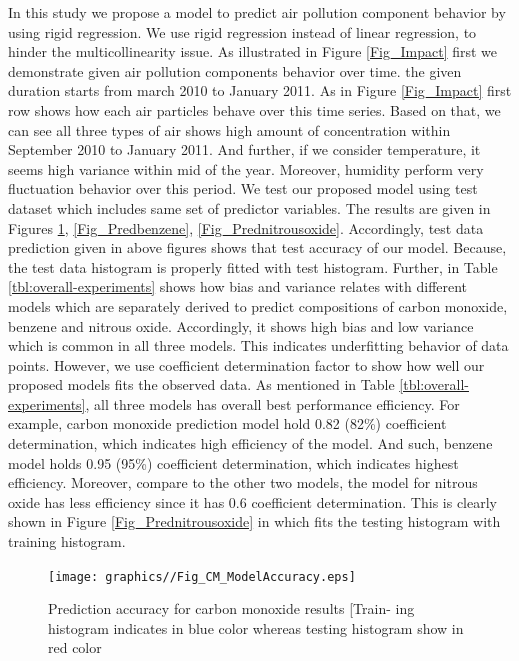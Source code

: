 In this study we propose a model to 
predict air pollution component behavior by using rigid regression. 
We use rigid regression instead of linear regression,
to hinder the multicollinearity issue. 
As illustrated in Figure \ref{Fig_Impact} first we 
demonstrate given air pollution components behavior over time.
the given duration starts from march 2010 to January 2011.
As in Figure \ref{Fig_Impact} first row shows how each 
air particles behave over this time series. 
Based on that, we can see all three types of air shows 
high amount of concentration within September 2010 to January 2011.
And further, if we consider temperature, it seems high variance within mid of the year.
Moreover, humidity perform very fluctuation behavior over this period.
We test our proposed model using test dataset which 
includes same set of predictor variables.
The results are given in Figures \ref{Fig_Predcarbon monoxide}, \ref{Fig_Predbenzene}, \ref{Fig_Prednitrousoxide}.
Accordingly, test data prediction given in above 
figures shows that test accuracy of our model. 
Because, the test data histogram is properly fitted with test histogram.
Further, in Table \ref{tbl:overall-experiments} shows how bias and variance relates with 
different models which are separately derived to 
predict compositions of carbon monoxide, benzene and nitrous oxide.
Accordingly, it shows high bias and low variance which is common in all three models.
This indicates underfitting behavior of data points.
However, we use coefficient determination factor to 
show how well our proposed models fits the observed data. 
As mentioned in Table \ref{tbl:overall-experiments}, 
all three models has overall best performance efficiency. 
For example, carbon monoxide prediction model hold 0.82 (82\%) coefficient determination, which indicates high efficiency of the model.
And such, benzene model holds 0.95 (95\%) coefficient determination, which indicates highest efficiency.
Moreover, compare to the other two models, the model for nitrous oxide has less efficiency since it has 0.6 coefficient determination. 
This is clearly shown in Figure \ref{Fig_Prednitrousoxide} in which fits the testing histogram with training histogram.

\begin{figure}
  \centering
 \texttt{[image: graphics//Fig\_CM\_ModelAccuracy.eps]}
  \caption{Prediction accuracy for carbon monoxide results [Train-
  ing histogram indicates in blue color whereas testing histogram
  show in red color} \label{Fig_Predcarbon monoxide}
\end{figure}

